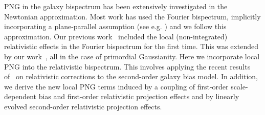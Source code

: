 PNG in the galaxy bispectrum has been extensively investigated in the Newtonian approximation. Most work has used the Fourier bispectrum, implicitly incorporating a plane-parallel assumption (see e.g. 
\cite{Verde:1999ij,Scoccimarro:2003wn,Sefusatti:2006pa,Sefusatti:2007ih,Giannantonio:2009,Baldauf:2010vn,Tellarini:2015faa,Tellarini:2016sgp,Desjacques:2016bnm,Watkinson:2017zbs,Majumdar:2017tdm,Karagiannis:2018jdt,Yankelevich:2018uaz,Sarkar:2019ojl,Karagiannis:2019jjx,Bharadwaj:2020wkc,Karagiannis:2020dpq, MoradinezhadDizgah:2020whw}) and we follow this approximation.
Our previous work~\cite{Umeh:2016nuh} included the local (non-integrated) relativistic effects in the Fourier bispectrum for the first time. This was extended by our work~\cite{Jolicoeur:2017nyt, Jolicoeur:2017eyi, Jolicoeur:2018blf,Clarkson:2018dwn,Maartens:2019yhx,deWeerd:2019cae, Jolicoeur:2020eup, Umeh:2020cag}, all in the case of primordial Gaussianity. 
Here we incorporate local PNG into the relativistic bispectrum. This involves applying the recent results of~\cite{Umeh:2019qyd, Umeh:2019jqg} on relativistic corrections to the second-order galaxy bias model. {In addition, we derive the new local  PNG terms induced by  a coupling of first-order scale-dependent bias and first-order relativistic projection effects and by linearly evolved second-order relativistic projection effects.}

